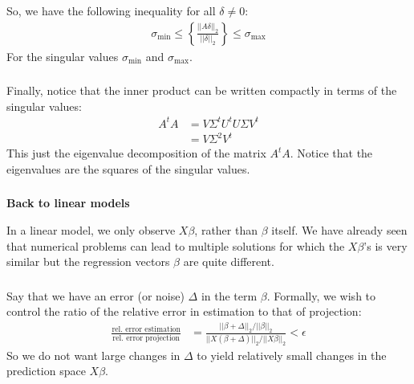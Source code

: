 \begin{frame}[fragile] \frametitle{}

So, we have the following inequality for all $\delta \neq 0$:
\begin{align*}
\sigma_{\text{min}} \leq \left\{\frac{|| A\delta ||_2}{||\delta||_2}\right\} \leq \sigma_{\text{max}}
\end{align*}
For the singular values $\sigma_{\text{min}}$ and $\sigma_{\text{max}}$.

\end{frame}

\begin{frame}[fragile] \frametitle{}

Finally, notice that the inner product can be written compactly in terms of
the singular values:
\begin{align*}
A^t A &= V \Sigma^t U^t U \Sigma V^t \\
&=  V \Sigma^2 V^t
\end{align*}
\pause This just the eigenvalue decomposition of the matrix $A^t A$. Notice
that the eigenvalues are the squares of the singular values.

\end{frame}

\begin{frame}[fragile] \frametitle{}

\textbf{Back to linear models}

In a linear model, we only observe $X \beta$, rather than $\beta$ itself.
We have already seen that numerical problems can lead to multiple solutions
for which the $X\beta$'s is very similar but the regression vectors $\beta$
are quite different.

\end{frame}


\begin{frame}[fragile] \frametitle{}

Say that we have an error (or noise) $\Delta$ in the term $\beta$.
Formally, we  wish to control the ratio of the relative error in
estimation to that of projection: \pause
\begin{align*}
\frac{\text{rel. error estimation}}{\text{rel. error projection}}
 &= \frac{|| \beta + \Delta ||_2 / || \beta ||_2}{|| X(\beta + \Delta) ||_2 / || X\beta ||_2}
 < \epsilon
\end{align*}
\pause So we do not want large changes in $\Delta$ to yield relatively
small changes in the prediction space $X\beta$.

\end{frame}

